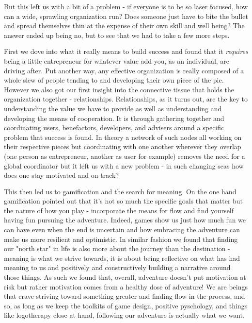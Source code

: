\documentclass[11pt]{book}
\begin{document}
But this left us with a bit of a problem - if everyone is to be so laser focused, how can a wide, sprawling organization run? Does someone just have to bite the bullet and spread themselves thin at the expense of their own skill and well being? The answer ended up being no, but to see that we had to take a few more steps. 
\newline

First we dove into what it really means to build success and found that it \textit{requires} being a little entrepreneur for whatever value add you, as an individual, are driving after. Put another way, any effective organization is really composed of a whole slew of people tending to and developing their own piece of the pie. However we also got our first insight into the connective tissue that holds the organization together - relationships. Relationships, as it turns out, are the key to understanding the value we have to provide as well as understanding and developing the means of cooperation. It is through gathering together and coordinating users, benefactors, developers, and advisers around a specific problem that success is found. In theory a network of such nodes all working on their respective pieces but coordinating with one another wherever they overlap (one person as entrepreneur, another as user for example) removes the need for a global coordinator but it left us with a new problem - in such changing seas how does one stay motivated and on track?
\newline

This then led us to gamification and the search for meaning. On the one hand gamification pointed out that it's not so much the specific goals that matter but the nature of how you play - incorporate the means for flow and find yourself having fun pursuing the adventure. Indeed, games show us just how much fun we can have even when the end is uncertain and how embracing the adventure can make us more resilient and optimistic. In similar fashion we found that finding our "north star" in life is also more about the journey than the destination - meaning is what we strive towards, it is about being reflective on what has had meaning to us and positively and constructively building a narrative around those things. As such we found that, overall, adventure doesn't put motivation at risk but rather motivation comes from a healthy dose of adventure! We are beings that crave striving toward something greater and finding flow in the process, and so, as long as we keep the toolkits of game design, positive pyschology, and things like logotherapy close at hand, following our adventure is actually what we want.
\newline
\end{document}
